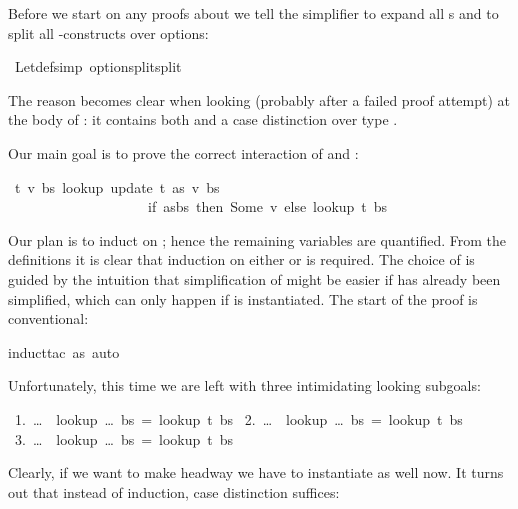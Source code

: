 \begin{isabellebody}
\begin{isamarkuptext}
Before we start on any proofs about  we tell the simplifier to
expand all s and to split all -constructs over
options:%
\end{isamarkuptext}%
\isamarkuptrue%
\isamarkupfalse%
\ Let{\isacharunderscore}def{\isacharbrackleft}simp{\isacharbrackright}\ option{\isachardot}split{\isacharbrackleft}split{\isacharbrackright}%
\begin{isamarkuptext}%
\noindent
The reason becomes clear when looking (probably after a failed proof
attempt) at the body of : it contains both
 and a case distinction over type .

Our main goal is to prove the correct interaction of  and
:%
\end{isamarkuptext}%
\isamarkuptrue%
\isamarkupfalse%
\ {\isachardoublequoteopen}{\isasymforall}t\ v\ bs{\isachardot}\ lookup\ {\isacharparenleft}update\ t\ as\ v{\isacharparenright}\ bs\ {\isacharequal}\isanewline
\ \ \ \ \ \ \ \ \ \ \ \ \ \ \ \ \ \ \ \ {\isacharparenleft}if\ as{\isacharequal}bs\ then\ Some\ v\ else\ lookup\ t\ bs{\isacharparenright}{\isachardoublequoteclose}%
\isadelimproof
%
\endisadelimproof
%
\isatagproof
%
\begin{isamarkuptxt}%
\noindent
Our plan is to induct on ; hence the remaining variables are
quantified. From the definitions it is clear that induction on either
 or  is required. The choice of  is 
guided by the intuition that simplification of  might be easier
if  has already been simplified, which can only happen if
 is instantiated.
The start of the proof is conventional:%
\end{isamarkuptxt}%
\isamarkuptrue%
\isamarkupfalse%
{\isacharparenleft}induct{\isacharunderscore}tac\ as{\isacharcomma}\ auto{\isacharparenright}%
\begin{isamarkuptxt}%
\noindent
Unfortunately, this time we are left with three intimidating looking subgoals:
\begin{isabelle}
~1.~\dots~{\isasymLongrightarrow}~lookup~\dots~bs~=~lookup~t~bs\isanewline
~2.~\dots~{\isasymLongrightarrow}~lookup~\dots~bs~=~lookup~t~bs\isanewline
~3.~\dots~{\isasymLongrightarrow}~lookup~\dots~bs~=~lookup~t~bs
\end{isabelle}
Clearly, if we want to make headway we have to instantiate  as
well now. It turns out that instead of induction, case distinction
suffices:%
\end{isamarkuptxt}%

\end{isabellebody}
